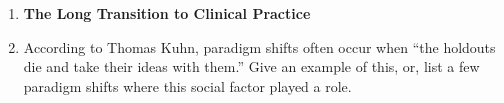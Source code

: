 \documentclass{article}
\begin{document}
\begin{enumerate}
\begin{enumerate}
\end{enumerate}
\item \textbf{The Long Transition to Clinical Practice}
\item According to Thomas Kuhn, paradigm shifts often occur when ``the holdouts die and take their ideas with them.''  Give an example of this, or, list a few paradigm shifts where this social factor played a role.
\end{enumerate}
\end{document}
